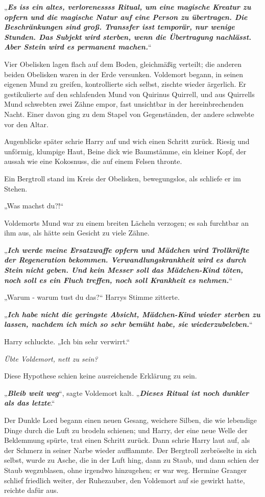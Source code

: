 {„\textbf{\emph{Es iss ein altes, verlorenessss Ritual, um eine magische Kreatur zu opfern und die magische Natur auf eine Person zu übertragen. Die Beschränkungen sind groß. Transsfer isst temporär, nur wenige Stunden. Das Subjekt wird sterben, wenn die Übertragung nachlässt. Aber Sstein wird es permanent machen.}}“

Vier Obelisken lagen flach auf dem Boden, gleichmäßig verteilt; die anderen beiden Obelisken waren in der Erde versunken. Voldemort begann, in seinen eigenen Mund zu greifen, kontrollierte sich selbst, zischte wieder ärgerlich. Er gestikulierte auf den schlafenden Mund von Quirinus Quirrell, und aus Quirrells Mund schwebten zwei Zähne empor, fast unsichtbar in der hereinbrechenden Nacht. Einer davon ging zu dem Stapel von Gegenständen, der andere schwebte vor den Altar.

Augenblicke später schrie Harry auf und wich einen Schritt zurück. Riesig und unförmig, klumpige Haut, Beine dick wie Baumstämme, ein kleiner Kopf, der aussah wie eine Kokosnuss, die auf einem Felsen thronte.

Ein Bergtroll stand im Kreis der Obelisken, bewegungslos, als schliefe er im Stehen.

„Was machst du?!“

Voldemorts Mund war zu einem breiten Lächeln verzogen; es sah furchtbar an ihm aus, als hätte sein Gesicht zu viele Zähne.

„\textbf{\emph{Ich werde meine Ersatzwaffe opfern und Mädchen wird Trollkräfte der Regeneration bekommen. Verwandlungskrankheit wird es durch Stein nicht geben. Und kein Messer soll das Mädchen-Kind töten, noch soll es ein Fluch treffen, noch soll Krankheit es nehmen.}}“

„Warum - warum tust du das?“ Harrys Stimme zitterte.

„\textbf{\emph{Ich habe nicht die geringste Absicht, Mädchen-Kind wieder sterben zu lassen, nachdem ich mich so sehr bemüht habe, sie wiederzubeleben.}}“

Harry schluckte. „Ich bin sehr verwirrt.“

\emph{Übte Voldemort, nett zu sein?}

Diese Hypothese schien keine ausreichende Erklärung zu sein.

„\textbf{\emph{Bleib weit weg}}“, sagte Voldemort kalt. „\textbf{\emph{Dieses Ritual ist noch dunkler als das letzte}}.“

Der Dunkle Lord begann einen neuen Gesang, weichere Silben, die wie lebendige Dinge durch die Luft zu brodeln schienen; und Harry, der eine neue Welle der Beklemmung spürte, trat einen Schritt zurück. Dann schrie Harry laut auf, als der Schmerz in seiner Narbe wieder aufflammte. Der Bergtroll zerbröselte in sich selbst, wurde zu Asche, die in der Luft hing, dann zu Staub, und dann schien der Staub wegzublasen, ohne irgendwo hinzugehen; er war weg. Hermine Granger schlief friedlich weiter, der Ruhezauber, den Voldemort auf sie gewirkt hatte, reichte dafür aus.

}
